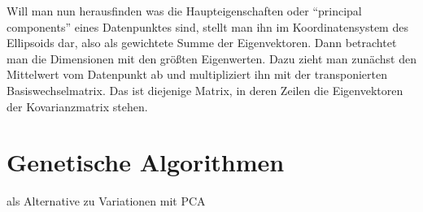  Will man nun herausfinden was die Haupteigenschaften oder "`principal components"' eines Datenpunktes sind, stellt man ihn im Koordinatensystem des Ellipsoids dar, also als gewichtete Summe der Eigenvektoren. Dann betrachtet man die Dimensionen mit den größten Eigenwerten. Dazu zieht man zunächst den Mittelwert vom Datenpunkt ab und multipliziert ihn mit der transponierten Basiswechselmatrix. Das ist diejenige Matrix, in deren Zeilen die Eigenvektoren der Kovarianzmatrix stehen.


\section{Genetische Algorithmen}

als Alternative zu Variationen mit PCA

